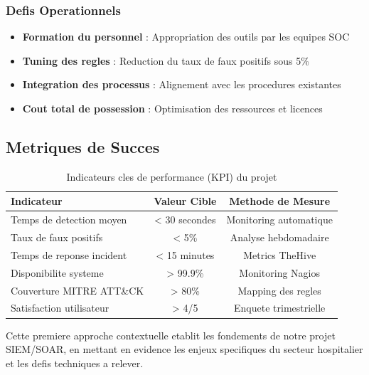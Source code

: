 \subsubsection{Defis Operationnels}

\begin{itemize}
    \item \textbf{Formation du personnel} : Appropriation des outils par les equipes SOC
    \item \textbf{Tuning des regles} : Reduction du taux de faux positifs sous 5\%
    \item \textbf{Integration des processus} : Alignement avec les procedures existantes
    \item \textbf{Cout total de possession} : Optimisation des ressources et licences
\end{itemize}

\subsection{Metriques de Succes}

\begin{table}[H]
    \centering
    \caption{Indicateurs cles de performance (KPI) du projet}
    \begin{tabular}{|l|c|c|}
        \hline
        \textbf{Indicateur}       & \textbf{Valeur Cible} & \textbf{Methode de Mesure} \\
        \hline
        Temps de detection moyen  & < 30 secondes         & Monitoring automatique     \\
        \hline
        Taux de faux positifs     & < 5\%                 & Analyse hebdomadaire       \\
        \hline
        Temps de reponse incident & < 15 minutes          & Metrics TheHive            \\
        \hline
        Disponibilite systeme     & > 99.9\%              & Monitoring Nagios          \\
        \hline
        Couverture MITRE ATT\&CK  & > 80\%                & Mapping des regles         \\
        \hline
        Satisfaction utilisateur  & > 4/5                 & Enquete trimestrielle      \\
        \hline
    \end{tabular}
\end{table}

Cette premiere approche contextuelle etablit les fondements de notre projet SIEM/SOAR, en mettant en evidence les enjeux specifiques du secteur hospitalier et les defis techniques a relever.
